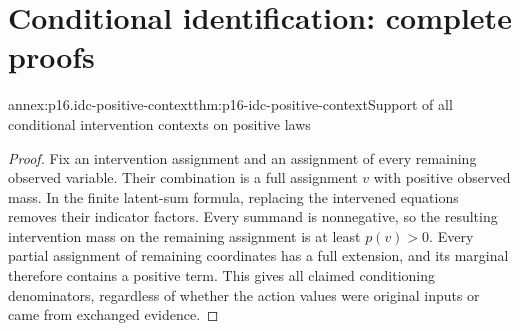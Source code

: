 \section{Conditional identification: complete proofs}
\label{sec:annex-p16-conditional-interventional-identification}

\begin{annexitem}{annex:p16.idc-positive-context}{thm:p16-idc-positive-context}{Support of all conditional intervention contexts on positive laws}
\begin{proof}
Fix an intervention assignment and an assignment of every remaining
observed variable. Their combination is a full assignment \(v\)
with positive observed mass. In the finite latent-sum formula,
replacing the intervened equations removes their indicator factors.
Every summand is nonnegative, so the resulting intervention mass
on the remaining assignment is at least \(p(v)>0\). Every
partial assignment of remaining coordinates has a full extension,
and its marginal therefore contains a positive term. This gives
all claimed conditioning denominators, regardless of whether the
action values were original inputs or came from exchanged evidence.
\end{proof}
\end{annexitem}

